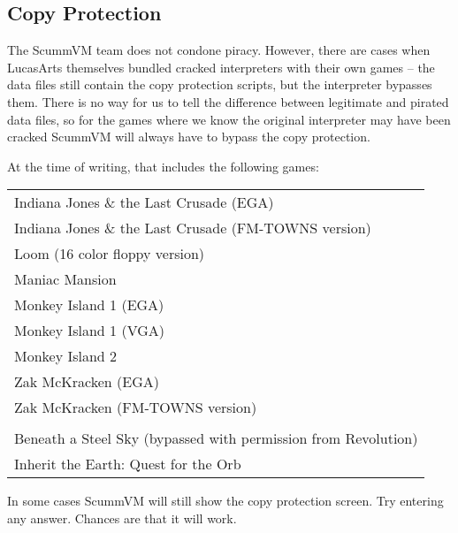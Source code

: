 \subsection{Copy Protection}

The ScummVM team does not condone piracy. However, there are cases when
LucasArts themselves bundled cracked interpreters with their own games --
the data files still contain the copy protection scripts, but the interpreter
bypasses them. There is no way for us to tell the difference between legitimate
and pirated data files, so for the games where we know the original interpreter
may have been cracked ScummVM will always have to bypass the copy protection.

At the time of writing, that includes the following games:

\begin{tabular}{l}
Indiana Jones \& the Last Crusade (EGA)\\
Indiana Jones \& the Last Crusade (FM-TOWNS version)\\
Loom (16 color floppy version)\\
Maniac Mansion\\
Monkey Island 1 (EGA)\\
Monkey Island 1 (VGA)\\
Monkey Island 2\\
Zak McKracken (EGA)\\
Zak McKracken (FM-TOWNS version)\\
\\
Beneath a Steel Sky (bypassed with permission from Revolution)\\
Inherit the Earth: Quest for the Orb
\end{tabular}

In some cases ScummVM will still show the copy protection screen. Try entering
any answer. Chances are that it will work.
